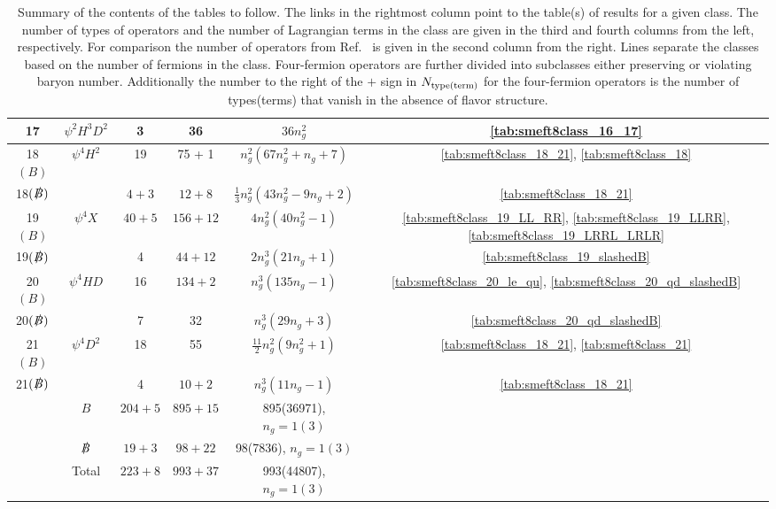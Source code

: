 \begin{table}[H]
\begin{center}
\begin{tabular}[t]{c | c | c | c | c | c}
17  & $\psi^2H^3D^2$  & 3 & 36  & $36 n_g^2$ &  \ref{tab:smeft8class_16_17} \\ \hline 
18$(B)$  & \multirow{2}{*}{$\psi^4H^2$}  & 19  & 75 + 1 & $n_g^2 (67 n_g^2 + n_g +7)$  &  \ref{tab:smeft8class_18_21}, \ref{tab:smeft8class_18} \\
18$(\slashed B)$  &                                 & $4+3$  & $12+8$ & $\tfrac{1}{3} n_g^2 (43 n_g^2 - 9 n_g + 2)$  &  \ref{tab:smeft8class_18_21} \\ 
19$(B)$  & \multirow{2}{*}{$\psi^4X$}  & $40+5$  & $156+12$ & $4 n_g^2 (40 n_g^2 - 1)$ &  \ref{tab:smeft8class_19_LL_RR}, \ref{tab:smeft8class_19_LLRR}, \ref{tab:smeft8class_19_LRRL_LRLR} \\
19$(\slashed B)$  &                             & 4  & $44+12$   & $2 n_g^3 (21 n_g + 1)$    &  \ref{tab:smeft8class_19_slashedB} \\
20$(B)$  & \multirow{2}{*}{$\psi^4HD$}  & 16  & $134+2$ & $n_g^3 (135 n_g - 1)$ &  \ref{tab:smeft8class_20_le_qu}, \ref{tab:smeft8class_20_qd_slashedB} \\
20$(\slashed B)$  &                                 & 7 & 32 & $n_g^3 (29 n_g + 3)$    &  \ref{tab:smeft8class_20_qd_slashedB} \\ 
21$(B)$  & \multirow{2}{*}{$\psi^4D^2$}  & 18  & 55 & $\tfrac{11}{2} n_g^2 (9 n_g^2 + 1)$ &  \ref{tab:smeft8class_18_21}, \ref{tab:smeft8class_21} \\
21$(\slashed B)$  &                                 & 4  & $10+2$ & $n_g^3 (11 n_g - 1)$   &  \ref{tab:smeft8class_18_21} \\ \hline \hline
  & $B$                & $204+5$  & $895+15$ & 895(36971), $n_g = 1 (3)$ & \\
  & $\slashed B$  & $19+3$     & $98+22$   & 98(7836), $n_g = 1 (3)$   & \\
  & Total               & $223+8$  & $993+37$ & 993(44807), $n_g = 1 (3)$ &
\end{tabular}
\end{center}
\caption{Summary of the contents of the tables to follow. 
The links in the rightmost column point to the table(s) of results for a given class.
The number of types of operators and the number of Lagrangian terms in the class are given in the third and fourth columns from the left, respectively.
For comparison the number of operators from Ref.~\cite{Henning:2015alf} is given in the second column from the right.
Lines separate the classes based on the number of fermions in the class. 
Four-fermion operators are further divided into subclasses either preserving or violating baryon number.
Additionally the number to the right of the $+$ sign in $N_{\rm type(term)}$ for the four-fermion operators is the number of types(terms) that vanish in the absence of flavor structure.}
\label{tab:summary}
\end{table}